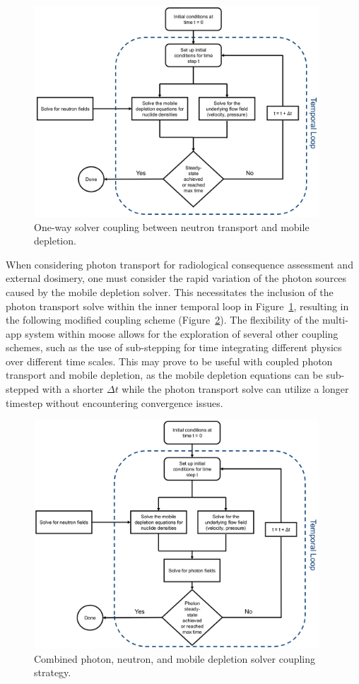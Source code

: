 \begin{figure}[H]
    \centering
    \includegraphics[width=0.95\textwidth]{images/solver/one_way.png}
    \caption{One-way solver coupling between neutron transport and mobile depletion.}
    \label{fig:solver:1_way}
\end{figure}

When considering photon transport for radiological consequence assessment and external dosimery, one must consider the rapid variation of the photon sources caused by the mobile depletion solver. This necessitates the inclusion of the photon transport solve within the inner temporal loop in Figure~\ref{fig:solver:1_way}, resulting in the following modified coupling scheme (Figure~\ref{fig:solver:1_way_photon_neutron}). The flexibility of the multi-app system within \acrshort{moose} allows for the exploration of several other coupling schemes, such as the use of sub-stepping for time integrating different physics over different time scales. This may prove to be useful with coupled photon transport and mobile depletion, as the mobile depletion equations can be sub-stepped with a shorter $\Delta t$ while the photon transport solve can utilize a longer timestep without encountering convergence issues.

\begin{figure}[H]
    \centering
    \includegraphics[width=0.95\textwidth]{images/solver/one_way_with_photon.png}
    \caption{Combined photon, neutron, and mobile depletion solver coupling strategy.}
    \label{fig:solver:1_way_photon_neutron}
\end{figure}

